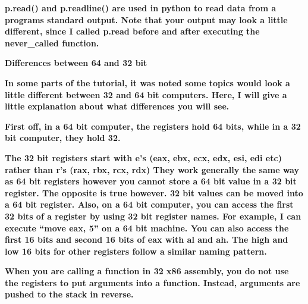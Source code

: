 \documentclass[letterpaper]{article}
\begin{document}
\textbf{p.read() and p.readline() are used in python to read data from a programs standard output. Note that your output
may look a little different, since I called p.read before and after executing the never\_called function.}

{\centering
\textbf{Differences between 64 and 32 bit}
\par}

\textbf{In some parts of the tutorial, it was noted some topics would look a little different between 32 and 64 bit
computers. Here, I will give a little explanation about what differences you will see. }

\textbf{First off, in a 64 bit computer, the registers hold 64 bits, while in a 32 bit computer, they hold 32. }

\textbf{The 32 bit registers start with e's (eax, ebx, ecx, edx, esi, edi etc) rather than r's (rax, rbx, rcx, rdx) They
work generally the same way as 64 bit registers however you cannot store a 64 bit value in a 32 bit register. The
opposite is true however. 32 bit values can be moved into a 64 bit register. Also, on a 64 bit computer, you can access
the first 32 bits of a register by using 32 bit register names. For example, I can execute ``move eax, 5'' on a 64 bit
machine. You can also access the first 16 bits and second 16 bits of eax with al and ah. The high and low 16 bits for
other registers follow a similar naming pattern. }

\textbf{When you are calling a function in 32 x86 assembly, you do not use the registers to put arguments into a
function. Instead, arguments are pushed to the stack in reverse. }
\end{document}
